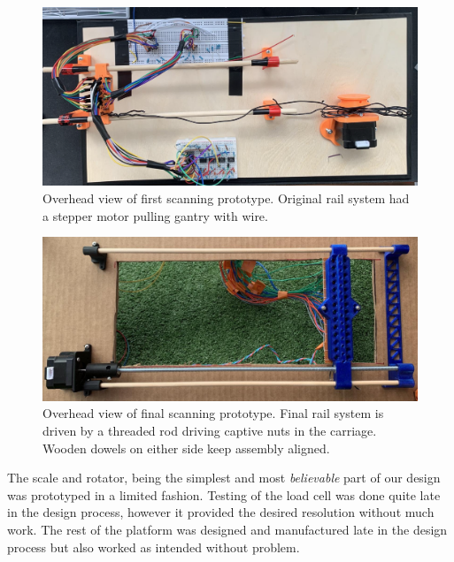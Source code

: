 \documentclass[12pt]{article}
\begin{document}
\begin{multicols*}{2}
            \begin{figure}[H]
                \centering\includegraphics[width=\linewidth]{BirdsEye.PNG}
                \captionsetup{width=\linewidth}
                \caption{Overhead view of first scanning prototype. Original rail system had a stepper motor pulling gantry with wire.}
                \label{fig:Overhead}
            \end{figure}

            \begin{figure}[H]
                \centering\includegraphics[width=\linewidth]{CarriageV2.png}
                \captionsetup{width=\linewidth}
                \caption{Overhead view of final scanning prototype. Final rail system is driven by a threaded rod driving captive nuts in the carriage. Wooden dowels on either side keep assembly aligned.}
                \label{fig:OverheadV2}
            \end{figure}

            The scale and rotator, being the simplest and most \textit{believable} part of our design was prototyped in a limited fashion. Testing of the load cell was done quite late in the design process, however it provided the desired resolution without much work. The rest of the platform was designed and manufactured late in the design process but also worked as intended without problem.


\end{multicols*}
\end{document}
